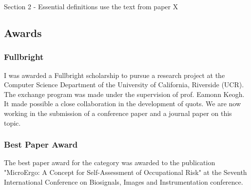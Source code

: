 Section 2 - Essential definitions use the text from paper X


\subsection{Awards}

\subsubsection{Fullbright}

I was awarded a Fullbright scholarship to pursue a research project at the Computer Science Department of the University of California, Riverside (UCR). The exchange program was made under the supervision of prof. Eamonn Keogh. It made possible a close collaboration in the development of \gls{quots}. We are now working in the submission of a conference paper and a journal paper on this topic.

\subsubsection{Best Paper Award}

The best paper award for the category was awarded to the publication "MicroErgo: A Concept for Self-Assessment of Occupational Risk" at the Seventh International Conference on Biosignals, Images and Instrumentation conference.
